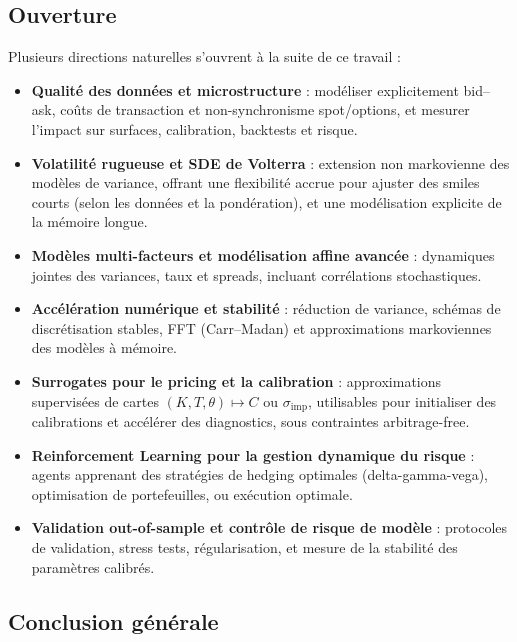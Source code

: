 \documentclass[11pt,a4paper]{article}
\newcommand{\1}{\mathbf{1}}
\begin{document}
\subsection{Ouverture}

Plusieurs directions naturelles s'ouvrent à la suite de ce travail :

\begin{itemize}
  \item \textbf{Qualit\'e des donn\'ees et microstructure} :
        mod\'eliser explicitement bid--ask, co\^uts de transaction et non-synchronisme spot/options, et mesurer l'impact sur
        surfaces, calibration, backtests et risque.
  \item \textbf{Volatilité rugueuse et SDE de Volterra} :
        extension non markovienne des mod\`eles de variance, offrant une
        flexibilit\'e accrue pour ajuster des smiles courts (selon les donn\'ees et la pond\'eration),
        et une mod\'elisation explicite de la m\'emoire longue.
  \item \textbf{Modèles multi-facteurs et modélisation affine avancée} :
        dynamiques jointes des variances, taux et spreads, incluant corr\'elations
        stochastiques.
  \item \textbf{Acc\'el\'eration num\'erique et stabilit\'e} :
        r\'eduction de variance, sch\'emas de discr\'etisation stables, FFT (Carr--Madan) et approximations markoviennes
        des mod\`eles \`a m\'emoire.
  \item \textbf{Surrogates pour le pricing et la calibration} :
        approximations supervis\'ees de cartes $(K,T,\theta)\mapsto C$ ou $\sigma_{\mathrm{imp}}$, utilisables pour initialiser
        des calibrations et acc\'el\'erer des diagnostics, sous contraintes arbitrage-free.
  \item \textbf{Reinforcement Learning pour la gestion dynamique du risque} :
        agents apprenant des stratégies de hedging optimales
        (delta-gamma-vega), optimisation de portefeuilles, ou exécution optimale.
  \item \textbf{Validation out-of-sample et contr\^ole de risque de mod\`ele} :
        protocoles de validation, stress tests, r\'egularisation, et mesure de la stabilit\'e des param\`etres calibr\'es.
\end{itemize}

\subsection{Conclusion générale}
\end{document}
